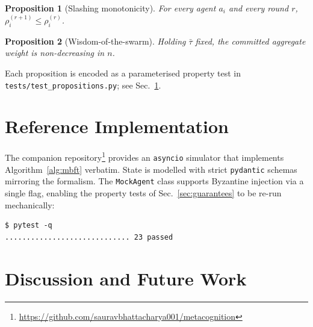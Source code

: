\documentclass[11pt,conference]{IEEEtran}
\newtheorem{proposition}{Proposition}
\begin{document}
\begin{proposition}[Slashing monotonicity]
\label{prop:monotone}
For every agent $a_i$ and every round $r$, $\rho_i^{(r+1)} \le
\rho_i^{(r)}$.
\end{proposition}

\begin{proposition}[Wisdom-of-the-swarm]
\label{prop:wisdom}
Holding $\bar\tau$ fixed, the committed aggregate weight is
non-decreasing in $n$.
\end{proposition}

Each proposition is encoded as a parameterised property test in
\texttt{tests/test\_propositions.py}; see Sec.~\ref{sec:implementation}.

\section{Reference Implementation}
\label{sec:implementation}

The companion repository\footnote{\url{https://github.com/sauravbhattacharya001/metacognition}}
provides an \texttt{asyncio} simulator that implements
Algorithm~\ref{alg:mbft} verbatim. State is modelled with strict
\texttt{pydantic} schemas mirroring the formalism. The
\texttt{MockAgent} class supports Byzantine injection via a single
flag, enabling the property tests of Sec.~\ref{sec:guarantees} to be
re-run mechanically:

\begin{verbatim}
$ pytest -q
............................. 23 passed
\end{verbatim}

\section{Discussion and Future Work}
\label{sec:future}
\end{document}
